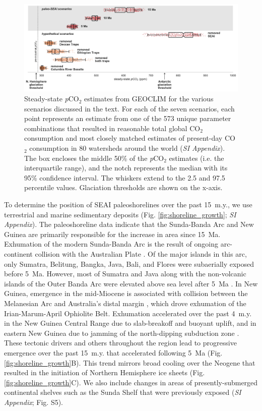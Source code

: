 \documentclass[9pt,twocolumn,twoside,lineno]{pnas-new}
\newcommand{\pCOtwo}{\textit{p}CO$_{2}$\xspace}
\newcommand{\COtwo}{CO$_{2}$\xspace}
\newcommand{\SI}{\textit{SI Appendix}\xspace}
\begin{document}
\begin{figure}[h]
    \centering
    \includegraphics[width=1\linewidth]{Figures/scenario_pCO2.pdf}
    \caption{Steady-state \pCOtwo estimates from GEOCLIM for the various scenarios discussed in the text. For each of the seven scenarios, each point represents an estimate from one of the 573 unique parameter combinations that resulted in reasonable total global \COtwo consumption and most closely matched estimates of present-day \COtwo consumption in 80 watersheds around the world (\SI). The box encloses the middle 50\% of the \pCOtwo estimates (i.e. the interquartile range), and the notch represents the median with its 95\% confidence interval. The whiskers extend to the 2.5 and 97.5 percentile values. Glaciation thresholds \cite{DeConto2008a} are shown on the x-axis.}
    \label{fig:scenario_pCO2}
\end{figure}

To determine the position of SEAI paleoshorelines over the past 15~m.y., we use terrestrial and marine sedimentary deposits (Fig. \ref{fig:shoreline_growth}; \SI). The paleoshoreline data indicate that the Sunda-Banda Arc and New Guinea are primarily responsible for the increase in area since 15~Ma. Exhumation of the modern Sunda-Banda Arc is the result of ongoing arc-continent collision with the Australian Plate \cite{Harris2006a}. Of the major islands in this arc, only Sumatra, Belitung, Bangka, Java, Bali, and Flores were subaerially exposed before 5~Ma. However, most of Sumatra and Java along with the non-volcanic islands of the Outer Banda Arc were elevated above sea level after 5~Ma \cite{Hall2013b}. In New Guinea, emergence in the mid-Miocene is associated with collision between the Melanesian Arc and Australia's distal margin \cite{Cloos2005a}, which drove exhumation of the Irian-Marum-April Ophiolite Belt. Exhumation accelerated over the past 4~m.y. in the New Guinea Central Range due to slab-breakoff and buoyant uplift, and in eastern New Guinea due to jamming of the north-dipping subduction zone \cite{Cloos2005a}. These tectonic drivers and others throughout the region lead to progressive emergence over the past 15~m.y. that accelerated following 5~Ma (Fig. \ref{fig:shoreline_growth}B). This trend mirrors broad cooling over the Neogene that resulted in the initiation of Northern Hemisphere ice sheets (Fig. \ref{fig:shoreline_growth}C). We also include changes in areas of presently-submerged continental shelves such as the Sunda Shelf that were previously exposed (\SI; Fig. S5).
\end{document}
